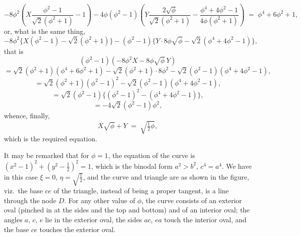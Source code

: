 \documentclass[11pt]{article}
\begin{document}
\newpage

\noindent
\[
-8\phi^{2}\left( X\frac{\phi^{2} - 1}{\sqrt{2}(\phi^{2} + 1)} - 1 \right) - 4\phi(\phi^{2} - 1)\left( Y\frac{2\sqrt{\phi}}{\sqrt{2}(\phi^{2} + 1)} - \frac{\phi^{4} + 4\phi^{2} - 1}{4\phi(\phi^{2} + 1)} \right) \;=\; \phi^{4} + 6\phi^{2} + 1,
\]
or, what is the same thing,
\[
-8\phi^{2}\{ X(\phi^{2} - 1) - \sqrt{2}(\phi^{2} + 1) \} - (\phi^{2} - 1)\{ Y \cdot 8\phi\sqrt{\phi} - \sqrt{2}(\phi^{4} + 4\phi^{2} - 1) \},
\]
that is
\[
(\phi^{2} - 1)(-8\phi^{2} X - 8\phi\sqrt{\phi}\, Y)
\]
\[
= \sqrt{2}(\phi^{2} + 1)(\phi^{4} + 6\phi^{2} + 1) - \sqrt{2}(\phi^{2} + 1) \cdot 8\phi^{2} - \sqrt{2}(\phi^{2} - 1)(\phi^{4} + 4\phi^{2} - 1),
\]
\[
= \sqrt{2}(\phi^{2} + 1)(\phi^{2} - 1)^{2} - \sqrt{2}(\phi^{2} - 1)(\phi^{4} + 4\phi^{2} - 1),
\]
\[
= \sqrt{2}(\phi^{2} - 1)\{(\phi^{2} - 1)^{2} - (\phi^{4} + 4\phi^{2} - 1)\},
\]
\[
= -4\sqrt{2}(\phi^{2} - 1)\phi^{2},
\]
whence, finally,
\[
X\sqrt{\phi} + Y \;=\; \sqrt{\tfrac{1}{2}\phi},
\]
which is the required equation.

It may be remarked that for $\phi=1$, the equation of the curve is $(x^{2} - 1)^{2} + (y^{2} - \tfrac{1}{2})^{2} = 1$, which is the binodal form $a^{2} > b^{2}$, $c^{4} = a^{4}$. We have in this case $\xi = 0$, $\eta = \sqrt{\tfrac{1}{2}}$, and the curve and triangle are as shown in the figure, viz.\ the base $ce$ of the triangle, instead of being a proper tangent, is a line through the node $D$. For any other value of $\phi$, the curve consists of an exterior oval (pinched in at the sides and the top and bottom) and of an interior oval; the angles $a$, $c$, $e$ lie in the exterior oval, the sides $ac$, $ea$ touch the interior oval, and the base $ce$ touches the exterior oval.

\medskip
\begin{center}
\end{center}
\end{document}
